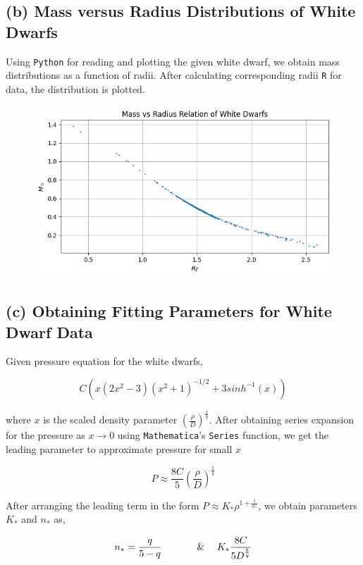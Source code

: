 \documentclass[aps,twocolumn,showpacs,preprintnumbers,nofootinbib,prl,superscriptaddress,groupedaddress]{revtex4-2}
\begin{document}
\newpage
\subsection{(b) Mass versus Radius Distributions of White Dwarfs}

Using \texttt{Python} for reading and plotting the given white dwarf, we obtain mass distributions as a function of radii. After calculating corresponding radii \texttt{R} for data, the distribution is plotted. 

\begin{figure}[!htb]
	\centering
	\includegraphics[width=0.7\linewidth]{Plots/newton-part-b}
	\caption{}
	\label{fig:newton-part-b}
\end{figure}


\subsection{(c) Obtaining Fitting Parameters for White Dwarf Data}

Given pressure equation for the white dwarfs,

\begin{equation}
	C(x( 2x^2 - 3)(x^2 + 1)^{-1/2} + 3sinh^{-1}(x))
\end{equation}

where $x$ is the scaled density parameter $(\frac{\rho}{D})^{\frac{1}{q}}$. After obtaining series expansion for the pressure as $x\to 0$ using \texttt{Mathematica}'s \texttt{Series} function, we get the leading parameter to approximate pressure for small $x$

\begin{equation}
	P \approx \frac{8C}{5}(\frac{\rho}{D})^{\frac{5}{q}}
\end{equation}

After arranging the leading term in the form $P \approx K_* \rho^{1+\frac{1}{n_*}}$, we obtain parameters $K_*$ and $n_*$ as,

\begin{align}
	n_* = \frac{q}{5-q} & \quad\quad\quad \And & K_* \frac{8C}{5D^{\frac{5}{q}}}
\end{align}
\end{document}
